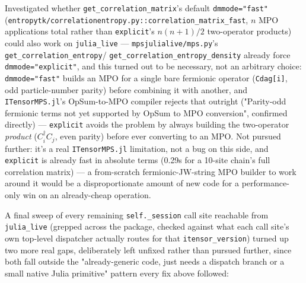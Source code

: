 \documentclass[11pt]{article}
\begin{document}
Investigated whether \texttt{get\_correlation\_matrix}'s default
\texttt{dmmode="fast"}
(\texttt{entropytk/correlationentropy.py::correlation\_matrix\_fast}, $n$
MPO applications total rather than \texttt{explicit}'s $n(n+1)/2$
two-operator products) could also work on \texttt{julia\_live} ---
\texttt{mpsjulialive/mps.py}'s \texttt{get\_correlation\_entropy}/
\texttt{get\_correlation\_entropy\_density} already force
\texttt{dmmode="explicit"}, and this turned out to be necessary, not an
arbitrary choice: \texttt{dmmode="fast"} builds an MPO for a single bare
fermionic operator (\texttt{Cdag[i]}, odd particle-number parity) before
combining it with another, and \texttt{ITensorMPS.jl}'s OpSum-to-MPO
compiler rejects that outright ("Parity-odd fermionic terms not yet
supported by OpSum to MPO conversion", confirmed directly) ---
\texttt{explicit} avoids the problem by always building the two-operator
\emph{product} ($C^\dagger_i C_j$, even parity) before ever converting
to an MPO. Not pursued further: it's a real \texttt{ITensorMPS.jl}
limitation, not a bug on this side, and \texttt{explicit} is already
fast in absolute terms (0.29s for a 10-site chain's full correlation
matrix) --- a from-scratch fermionic-JW-string MPO builder to work
around it would be a disproportionate amount of new code for a
performance-only win on an already-cheap operation.

A final sweep of every remaining \texttt{self.\_session} call site
reachable from \texttt{julia\_live} (grepped across the package, checked
against what each call site's own top-level dispatcher actually routes
for that \texttt{itensor\_version}) turned up two more real gaps,
deliberately left unfixed rather than pursued further, since both fall
outside the "already-generic code, just needs a dispatch branch or a
small native Julia primitive" pattern every fix above followed:
\end{document}
